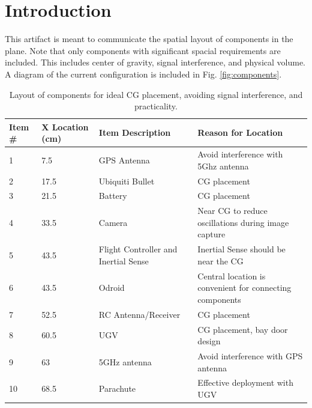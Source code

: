 \documentclass[]{auvsi_doc}
\begin{document}
	
	\begin{AUVSITitlePage}
		\begin{artifacttable}
		\end{artifacttable}
	\end{AUVSITitlePage}
	
	\section{Introduction}
	This artifact is meant to communicate the spatial layout of components in the plane. Note that only components with significant spacial requirements are included. This includes center of gravity, signal interference, and physical volume. A diagram of the current configuration is included in Fig. \ref{fig:components}.
	
	
	\begin{table}[h!]
		\begin{center}
			\caption{Layout of components for ideal CG placement, avoiding signal interference, and practicality.}
			\label{table:components}
			\begin{tabular}{p{1cm}p{2.5cm}p{4cm}p{7cm}}
				\toprule
				Item \# & X Location (cm) & Item Description & Reason for Location & \\
				\midrule
				1 & 7.5 & GPS Antenna & Avoid interference with 5Ghz antenna \\
				2 & 17.5 & Ubiquiti Bullet & CG placement \\
				3 & 21.5 & Battery & CG placement \\
				4 & 33.5 & Camera & Near CG to reduce oscillations during image capture \\
				5 & 43.5 & Flight Controller and Inertial Sense & Inertial Sense should be near the CG  \\
				6 & 43.5 & Odroid & Central location is convenient for \newline connecting components \\
				7 & 52.5 & RC Antenna/Receiver & CG placement \\
				8 & 60.5 & UGV & CG placement, bay door design \\
				9 & 63 & 5GHz antenna & Avoid interference with GPS antenna \\
				10 & 68.5 & Parachute & Effective deployment with UGV \\
				\bottomrule
			\end{tabular}
		\end{center}
	\end{table}
	
\end{document}
